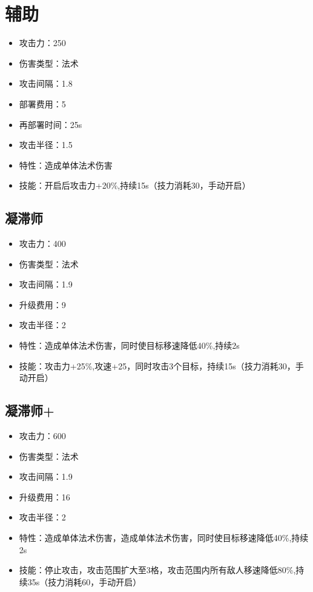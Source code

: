\documentclass[a4paper,12pt]{article}
\begin{document}
	\section{辅助}
		\begin{itemize}
			\item 攻击力：250
			\item 伤害类型：法术
			\item 攻击间隔：1.8
			\item 部署费用：5
			\item 再部署时间：25s
			\item 攻击半径：1.5
			\item 特性：造成单体法术伤害
			\item 技能：开启后攻击力+20\%,持续15s（技力消耗30，手动开启）
		\end{itemize}
		\subsection{凝滞师}
			\begin{itemize}
				\item 攻击力：400
				\item 伤害类型：法术
				\item 攻击间隔：1.9
				\item 升级费用：9
				\item 攻击半径：2
				\item 特性：造成单体法术伤害，同时使目标移速降低40\%,持续2s
				\item 技能：攻击力+25\%,攻速+25，同时攻击3个目标，持续15s（技力消耗30，手动开启）
			\end{itemize}
		\subsection{凝滞师+}
			\begin{itemize}
				\item 攻击力：600
				\item 伤害类型：法术
				\item 攻击间隔：1.9
				\item 升级费用：16
				\item 攻击半径：2
				\item 特性：造成单体法术伤害，造成单体法术伤害，同时使目标移速降低40\%,持续2s
				\item 技能：停止攻击，攻击范围扩大至3格，攻击范围内所有敌人移速降低80\%,持续35s（技力消耗60，手动开启）
			\end{itemize}	
\end{document}

